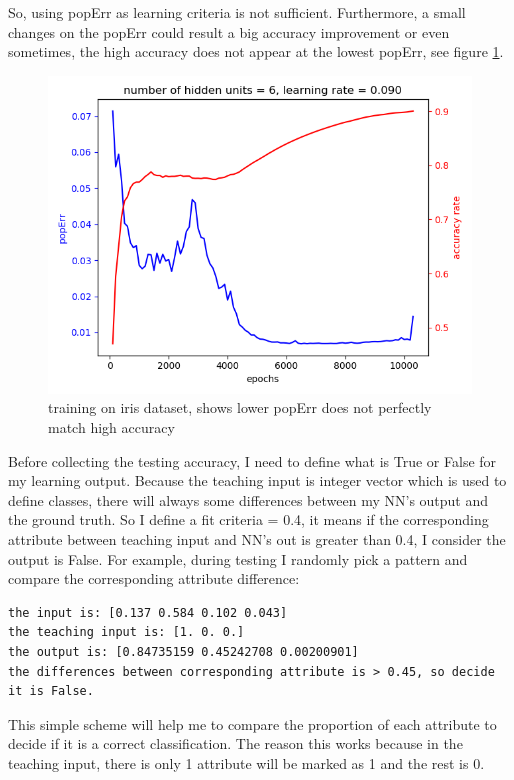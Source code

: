 \documentclass[11pt]{article}
\begin{document}
So, using popErr as learning criteria is not sufficient. Furthermore, a small changes on the popErr could result a big accuracy improvement or even sometimes, the high accuracy does not appear at the lowest popErr, see figure \ref{fig-iris-low-poperr-high-accuracy}.
\begin{figure}[htb]
\centering
\includegraphics[width=.9\linewidth]{./popErr_vs_accuracy_on_iris_oscillate02.png}
\caption{training on iris dataset, shows lower popErr does not perfectly match high accuracy \label{fig-iris-low-poperr-high-accuracy}}
\end{figure}

Before collecting the testing accuracy, I need to define what is True or False for my learning output. Because the teaching input is integer vector which is used to define classes, there will always some differences between my NN's output and the ground truth. So I define a fit criteria = 0.4, it means if the corresponding attribute between teaching input and NN's out is greater than 0.4, I consider the output is False. For example, during testing I randomly pick a pattern and compare the corresponding attribute difference:
\begin{verbatim}
the input is: [0.137 0.584 0.102 0.043]
the teaching input is: [1. 0. 0.]
the output is: [0.84735159 0.45242708 0.00200901]
the differences between corresponding attribute is > 0.45, so decide it is False.
\end{verbatim}

This simple scheme will help me to compare the proportion of each attribute to decide if it is a correct classification. The reason this works because in the teaching input, there is only 1 attribute will be marked as 1 and the rest is 0.
\end{document}
